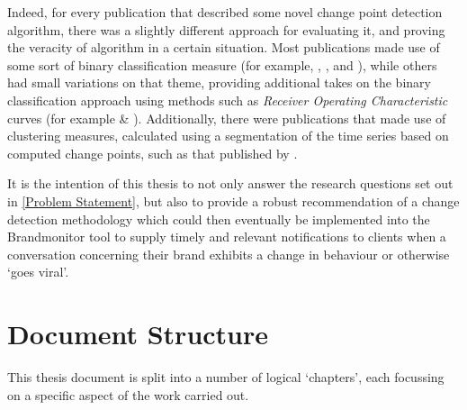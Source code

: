 \documentclass[../main.tex]{subfiles}
\begin{document}
Indeed, for every publication that described some novel change point detection algorithm, there was a slightly different approach for evaluating it, and proving the veracity of algorithm in a certain situation. Most publications made use of some sort of binary classification measure (for example, \citeauthor{Qahtan2015} \cite{Qahtan2015}, \citeauthor{Buntain2014} \cite{Buntain2014}, and \citeauthor{Pelecanos2010} \cite{Pelecanos2010}), while others had small variations on that theme, providing additional takes on the binary classification approach using methods such as \emph{Receiver Operating Characteristic} curves (for example \citeauthor{Fawcett1999} \cite{Fawcett1999} \& \citeauthor{Desobry2005} \cite{Desobry2005}). Additionally, there were publications that made use of clustering measures, calculated using a segmentation of the time series based on computed change points, such as that published by \citeauthor{Matteson2012} \cite{Matteson2012}.

It is the intention of this thesis to not only answer the research questions set out in \autoref{Problem Statement}, but also to provide a robust recommendation of a change detection methodology which could then eventually be implemented into the Brandmonitor tool to supply timely and relevant notifications to clients when a conversation concerning their brand exhibits a change in behaviour or otherwise `goes viral'.

\section{Document Structure}

This thesis document is split into a number of logical `chapters', each focussing on a specific aspect of the work carried out.
\end{document}
